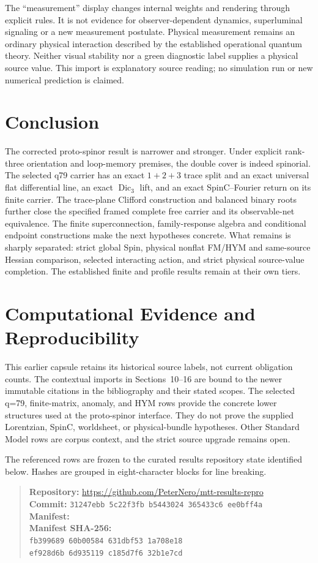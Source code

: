 \documentclass[11pt]{article}
\begin{document}
The ``measurement'' display changes internal weights and rendering through
explicit rules. It is not evidence for observer-dependent dynamics,
superluminal signaling or a new measurement postulate. Physical measurement
remains an ordinary physical interaction described by the established
operational quantum theory. Neither visual stability nor a green diagnostic
label supplies a physical source value. This import is explanatory source
reading; no simulation run or new numerical prediction is claimed.

\section{Conclusion}

The corrected proto-spinor result is narrower and stronger.  Under explicit
rank-three orientation and loop-memory premises, the double cover is indeed
spinorial.  The selected q79 carrier has an exact $1+2+3$ trace split and an
exact universal flat differential line, an exact $\operatorname{Dic}_3$ lift,
and an exact SpinC--Fourier return on its finite carrier. The trace-plane
Clifford construction and balanced binary roots further close the specified
framed complete free carrier and its observable-net equivalence. The finite
superconnection, family-response algebra and conditional endpoint constructions
make the next hypotheses concrete. What remains is sharply separated: strict
global Spin, physical nonflat FM/HYM and same-source Hessian comparison,
selected interacting action, and strict physical source-value completion.
The established finite and profile results remain at their own tiers.

\section*{Computational Evidence and Reproducibility}
This earlier capsule retains its historical source labels, not current
obligation counts. The contextual imports in Sections~10--16 are bound to
the newer immutable citations in the bibliography and their stated scopes.
The selected q=79, finite-matrix, anomaly, and HYM rows provide the concrete lower structures used at the proto-spinor interface. They do not prove the supplied Lorentzian, SpinC, worldsheet, or physical-bundle hypotheses. Other Standard Model rows are corpus context, and the strict source upgrade remains open.

The referenced rows are frozen to the curated results repository state identified below. Hashes are grouped in eight-character blocks for line breaking.
\begin{quote}\small
\textbf{Repository:} \url{https://github.com/PeterNero/mtt-results-repro}\\
\textbf{Commit:} \texttt{31247ebb 5c22f3fb b5443024 365433c6 ee0bff4a}\\
\textbf{Manifest:} \\
\textbf{Manifest SHA-256:}\\
\texttt{fb399689 60b00584 631dbf53 1a708e18}\\
\texttt{ef928d6b 6d935119 c185d7f6 32b1e7cd}
\end{quote}
\end{document}
